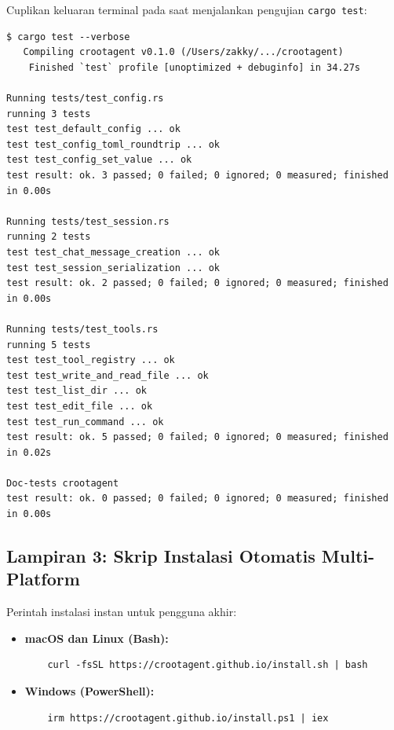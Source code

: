 Cuplikan keluaran terminal pada saat menjalankan pengujian \texttt{cargo test}:
\begin{verbatim}
$ cargo test --verbose
   Compiling crootagent v0.1.0 (/Users/zakky/.../crootagent)
    Finished `test` profile [unoptimized + debuginfo] in 34.27s

Running tests/test_config.rs
running 3 tests
test test_default_config ... ok
test test_config_toml_roundtrip ... ok
test test_config_set_value ... ok
test result: ok. 3 passed; 0 failed; 0 ignored; 0 measured; finished in 0.00s

Running tests/test_session.rs
running 2 tests
test test_chat_message_creation ... ok
test test_session_serialization ... ok
test result: ok. 2 passed; 0 failed; 0 ignored; 0 measured; finished in 0.00s

Running tests/test_tools.rs
running 5 tests
test test_tool_registry ... ok
test test_write_and_read_file ... ok
test test_list_dir ... ok
test test_edit_file ... ok
test test_run_command ... ok
test result: ok. 5 passed; 0 failed; 0 ignored; 0 measured; finished in 0.02s

Doc-tests crootagent
test result: ok. 0 passed; 0 failed; 0 ignored; 0 measured; finished in 0.00s
\end{verbatim}

\vspace{0.8cm}
\subsection*{Lampiran 3: Skrip Instalasi Otomatis Multi-Platform}

Perintah instalasi instan untuk pengguna akhir:
\begin{itemize}
    \item \textbf{macOS dan Linux (Bash):}
    \begin{verbatim}
    curl -fsSL https://crootagent.github.io/install.sh | bash
    \end{verbatim}
    \item \textbf{Windows (PowerShell):}
    \begin{verbatim}
    irm https://crootagent.github.io/install.ps1 | iex
    \end{verbatim}
\end{itemize}
